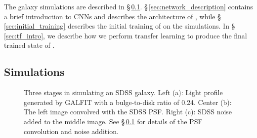 The galaxy simulations are described in \S\,\ref{sec:simulation_code}. \S\,\ref{sec:network_description} contains a brief introduction to CNNs and describes the architecture of \gamornet{}, while \S\,\ref{sec:initial_training} describes the initial training of \gamornet{} on the simulations. In \S\,\ref{sec:tf_intro}, we describe how we perform transfer learning to produce the final trained state of \gamornet{}.

\subsection{Simulations} \label{sec:simulation_code}

\begin{figure}[hbt]
	\begin{center}
  \end{center}
  \caption{Three stages in simulating an SDSS galaxy. Left (a): Light profile generated by GALFIT with a bulge-to-disk ratio of 0.24. Center (b): The left image convolved with the SDSS PSF. Right (c): SDSS noise added to the middle image. See \S\,\ref{sec:simulation_code} for details of the PSF convolution and noise addition.}
  \label{fig:psf_noise}
\end{figure}


